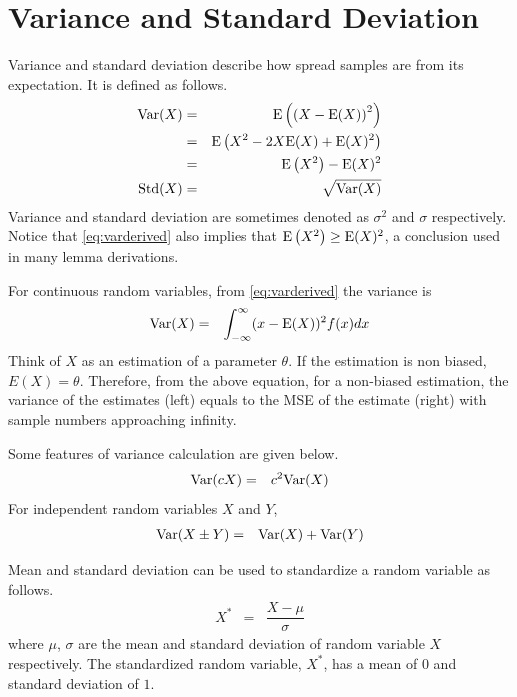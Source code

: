 \section{Variance and Standard Deviation}

Variance and standard deviation describe how spread samples are from its expectation. It is defined as follows.
\begin{eqnarray}
  \textup{Var}(X) &=& \textup{E}\left(\left(X-\textup{E}(X)\right)^2\right) \label{eq:vardef} \\
  &=& \textup{E}\left(X^2-2X\textup{E}(X)+\textup{E}(X)^2\right) \nonumber \\
  &=& \textup{E}\left(X^2\right)-\textup{E}(X)^2 \label{eq:varderived} \\
  \textup{Std}(X) &=& \sqrt{\textup{Var}(X)} \nonumber
\end{eqnarray}
Variance and standard deviation are sometimes denoted as $\sigma^2$ and $\sigma$ respectively. Notice that \eqref{eq:varderived} also implies that $\textup{E}\left(X^2\right) \geq \textup{E}(X)^2$, a conclusion used in many lemma derivations.

For continuous random variables, from \eqref{eq:varderived} the variance is
\begin{eqnarray}
  \textup{Var}(X) &=& \int_{-\infty}^{\infty} (x-\textup{E}(X))^2f(x)dx \nonumber
\end{eqnarray}
Think of $X$ as an estimation of a parameter $\theta$. If the estimation is non biased, $E(X)=\theta$. Therefore, from the above equation, for a non-biased estimation, the variance of the estimates (left) equals to the MSE of the estimate (right) with sample numbers approaching infinity.

Some features of variance calculation are given below.
\begin{eqnarray}
  \textup{Var}(cX) &=& c^2\textup{Var}(X) \nonumber
\end{eqnarray}
For independent random variables $X$ and $Y$,
\begin{eqnarray}
  \textup{Var}(X\pm Y) &=& \textup{Var}(X) + \textup{Var}(Y) \nonumber
\end{eqnarray}

Mean and standard deviation can be used to standardize a random variable as follows.
\begin{eqnarray}
  X^* &=& \dfrac{X-\mu}{\sigma} \nonumber
\end{eqnarray}
where $\mu$, $\sigma$ are the mean and standard deviation of random variable $X$ respectively. The standardized random variable, $X^*$, has a mean of $0$ and standard deviation of $1$.

